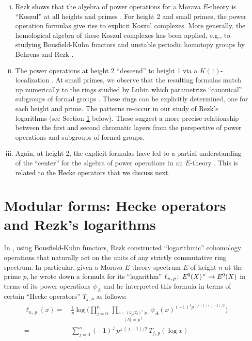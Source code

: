 \documentclass{rs}
\theoremstyle{definition}
\theoremstyle{remark}
\def\co{\colon\thinspace}
\newcommand{\mb}[1]{\mathbb{#1}}
\newcommand{\BQ}{{\mb Q}}
\newcommand{\BZ}{{\mb Z}}
\renewcommand{\=}{\approx}
\renewcommand{\-}{\sim}
\numberwithin{equation}{section}
\begin{document}
\begin{enumerate}[(i)]
 \item Rezk shows that the algebra of power operations for a Morava $E$-theory 
 is ``Koszul'' at all heights and primes \cite{Koszul, mc1}.  For height 2 and 
 small primes, the power operation formulas give rise to explicit Koszul 
 complexes.  More generally, the homological algebra of these Koszul complexes 
 has been applied, e.g., to studying Bousfield-Kuhn functors and unstable 
 periodic homotopy groups by Behrens and Rezk \cite{BKTAQ}.  

 \item The power operations at height 2 ``descend'' to height 1 via a 
 $K(1)$-localization \cite[Section 4]{p3}.  At small primes, we observe that the 
 resulting formulas match up numerically to the rings studied by Lubin which 
 parametrize ``canonical'' subgroups of formal groups \cite{can}.  These rings 
 can be explicitly determined, one for each height and prime.  The patterns 
 re-occur in our study of Rezk's logarithms (see Section \ref{sec:ho} below).  
 These suggest a more precise relationship between the first and second 
 chromatic layers from the perspective of power operations and subgroups of 
 formal groups.  

 \item Again, at height 2, the explicit formulas have led to a partial 
 understanding of the ``center'' for the algebra of power operations in an 
 $E$-theory \cite[Theorem 6.8]{ho}.  This is related to the Hecke operators that 
 we discuss next.  
\end{enumerate}



\section{Modular forms: Hecke operators and Rezk's logarithms}
\label{sec:ho}

In \cite{log}, using Bousfield-Kuhn functors, Rezk constructed ``logarithmic'' 
cohomology operations that naturally act on the units of any strictly 
commutative ring spectrum.  In particular, given a Morava $E$-theory spectrum 
$E$ of height $n$ at the prime $p$, he wrote down a formula for its 
``logarithm'' $\ell_{n,\,p} \co E^0(X)^\times \to E^0(X)$ in terms of its power 
operations $\psi_A$ \cite[Theorem 1.11]{log} and he interpreted this formula in 
terms of certain ``Hecke operators'' $T_{j,\,p}$ as follows: 
\begin{equation}
 \label{log}
 \begin{split}
  \ell_{n,\,p}(x) = & ~ \frac{1}{p} \log\Bigg( \prod_{j = 0}^n ~ 
                        \prod_{\stackrel{\scriptstyle 
                        A\,\subset\,(\BQ_p/\BZ_p)^n [p]}{|A| = p^{\,j}}} 
                        \psi_A(x)^{(-1)^{\,j} p^{(\,j - 1) (\,j - 2) / 2}} 
                        \Bigg) \\
                  = & ~ \sum_{j = 0}^n (-1)^{\,j} \, p^{\,j \, (\,j - 1) / 2} \, 
                        T_{j,\,p} (\log x) 
 \end{split}
\end{equation}
\end{document}
